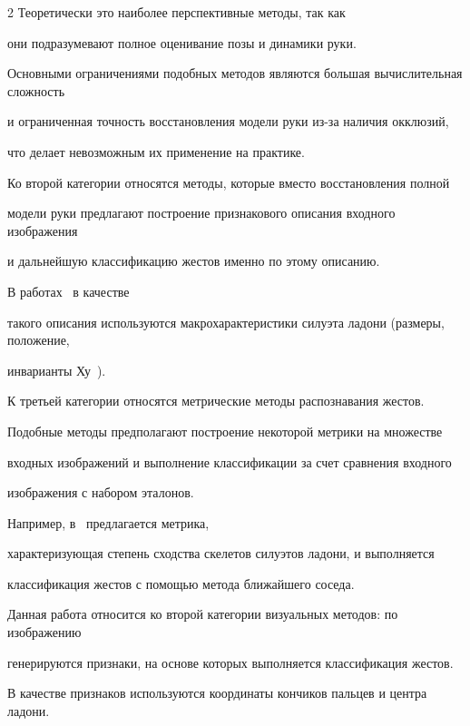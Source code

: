 \begin{multicols}{2}
Теоретически это наиболее перспективные методы, так как 


они подразумевают полное оценивание позы и динамики руки.


Основными ограничениями подобных методов являются большая вы\-чис\-ли\-тель\-ная слож\-ность 


и ограниченная точность восстановления модели руки из-за наличия окклюзий,


что делает невозможным их применение на практике.





Ко второй категории относятся методы, которые вместо восстановления полной 


модели руки предлагают построение признакового описания входного изображения 


и дальнейшую классификацию жес\-тов именно по этому описанию.


В работах~\cite{BareHand3d2006, GestureRecognitionVisapp2007} в качестве 


такого описания используются макрохарактеристики силуэта ладони (размеры, положение, 


инварианты Ху~\cite{HuInvariants}).





К третьей категории относятся метрические методы распознавания жестов.


Подобные методы предполагают построение некоторой метрики на множестве 


входных изображений и выполнение классификации за счет сравнения входного 


изображения с набором эталонов.


Например, в~\cite{StableSkeletonization2010} предлагается метрика, 


характеризующая степень сходства скелетов силуэтов ладони, и выполняется 


классификация жестов с помощью метода ближайшего соседа.





Данная работа относится ко второй категории визуальных методов: по изображению 


генерируются признаки, на основе которых выполняется классификация жестов.


В качестве признаков используются координаты кончиков пальцев и центра ладони.






\end{multicols}
